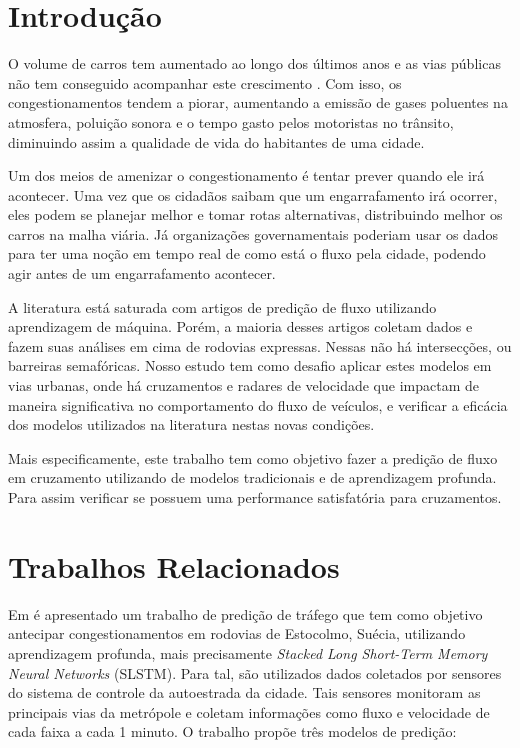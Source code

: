 \documentclass[conference]{IEEEtran}
\begin{document}
\section{Introdução}

O volume de carros tem aumentado ao longo dos últimos anos e as vias públicas não tem conseguido acompanhar este crescimento \cite{b7}. Com isso, os congestionamentos tendem a piorar, aumentando a emissão de gases poluentes na atmosfera, poluição sonora e o tempo gasto pelos motoristas no trânsito, diminuindo assim a qualidade de vida do habitantes de uma cidade.

Um dos meios de amenizar o congestionamento é tentar prever quando ele irá acontecer. Uma vez que os cidadãos saibam que um engarrafamento irá ocorrer, eles podem se planejar melhor e tomar rotas alternativas, distribuindo melhor os carros na malha viária. Já organizações governamentais poderiam usar os dados para ter uma noção em tempo real de como está o fluxo pela cidade, podendo agir antes de um engarrafamento acontecer.

A literatura está saturada com artigos de predição de fluxo utilizando aprendizagem de máquina. Porém, a maioria desses artigos coletam dados e fazem suas análises em cima de rodovias expressas. Nessas não há intersecções, ou barreiras semafóricas. Nosso estudo tem como desafio aplicar estes modelos em vias urbanas,  onde  há  cruzamentos  e  radares  de  velocidade  que impactam de maneira significativa no comportamento do fluxo de veículos, e verificar a eficácia dos modelos utilizados na literatura nestas novas condições.

Mais especificamente, este trabalho tem como objetivo fazer a predição de fluxo em cruzamento utilizando de modelos tradicionais e de aprendizagem profunda. Para assim verificar se possuem uma performance satisfatória para cruzamentos. 

\section{Trabalhos Relacionados}
Em  \cite{b2} é apresentado um trabalho de predição de tráfego que tem como objetivo antecipar congestionamentos em rodovias de Estocolmo, Suécia, utilizando aprendizagem profunda, mais precisamente \textit{Stacked Long Short-Term Memory Neural Networks} (SLSTM). Para tal, são utilizados dados coletados por sensores do sistema de controle da autoestrada da cidade. Tais sensores monitoram as principais vias da metrópole e coletam informações como fluxo e velocidade de cada faixa a cada 1 minuto. O trabalho propõe três modelos de predição:
\end{document}
